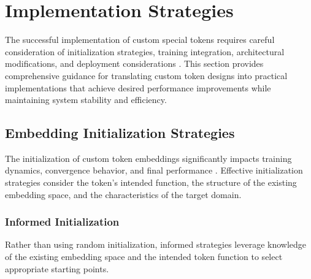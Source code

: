 
\section{Implementation Strategies}

The successful implementation of custom special tokens requires careful consideration of initialization strategies, training integration, architectural modifications, and deployment considerations \citep{liu2019roberta, rogers2020primer}. This section provides comprehensive guidance for translating custom token designs into practical implementations that achieve desired performance improvements while maintaining system stability and efficiency.

\subsection{Embedding Initialization Strategies}

The initialization of custom token embeddings significantly impacts training dynamics, convergence behavior, and final performance \citep{reif2019visualizing, ethayarajh2019contextual}. Effective initialization strategies consider the token's intended function, the structure of the existing embedding space, and the characteristics of the target domain.
\begin{comment}
Feedback: Before linking to the code, it's crucial to explain the core idea. For example: "A key decision is how to initialize the embedding for a new token. A poor initialization can destabilize training. The two main strategies are:
1.  **Random Initialization**: Simple, but can slow down convergence as the model has to learn the token's meaning from scratch. It's important to use a small standard deviation to avoid large initial gradients.
2.  **Informed Initialization**: A more effective approach where the new token's embedding is initialized based on the embeddings of existing, semantically related tokens. This gives the model a strong 'hint' about the token's purpose and can significantly speed up learning."
\end{comment}

\subsubsection{Informed Initialization}

Rather than using random initialization, informed strategies leverage knowledge of the existing embedding space and the intended token function to select appropriate starting points.

